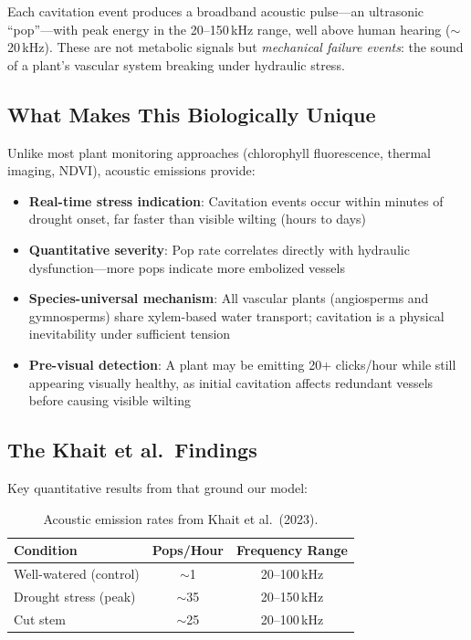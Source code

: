 \documentclass[11pt,a4paper,twocolumn]{article}
\begin{document}
Each cavitation event produces a broadband acoustic pulse---an ultrasonic ``pop''---with peak energy in the 20--150\,kHz range, well above human hearing ($\sim$20\,kHz). These are not metabolic signals but \emph{mechanical failure events}: the sound of a plant's vascular system breaking under hydraulic stress.

\subsection{What Makes This Biologically Unique}

Unlike most plant monitoring approaches (chlorophyll fluorescence, thermal imaging, NDVI), acoustic emissions provide:

\begin{itemize}[nosep]
    \item \textbf{Real-time stress indication}: Cavitation events occur within minutes of drought onset, far faster than visible wilting (hours to days)
    \item \textbf{Quantitative severity}: Pop rate correlates directly with hydraulic dysfunction---more pops indicate more embolized vessels
    \item \textbf{Species-universal mechanism}: All vascular plants (angiosperms and gymnosperms) share xylem-based water transport; cavitation is a physical inevitability under sufficient tension
    \item \textbf{Pre-visual detection}: A plant may be emitting 20+ clicks/hour while still appearing visually healthy, as initial cavitation affects redundant vessels before causing visible wilting
\end{itemize}

\subsection{The Khait et al.\ Findings}

Key quantitative results from \cite{khait2023} that ground our model:

\begin{table}[H]
\centering
\caption{Acoustic emission rates from Khait et al.\ (2023).}
\label{tab:khait}
\begin{tabular}{@{}lcc@{}}
\toprule
\textbf{Condition} & \textbf{Pops/Hour} & \textbf{Frequency Range} \\
\midrule
Well-watered (control) & $\sim$1 & 20--100\,kHz \\
Drought stress (peak) & $\sim$35 & 20--150\,kHz \\
Cut stem & $\sim$25 & 20--100\,kHz \\
\bottomrule
\end{tabular}
\end{table}
\end{document}
